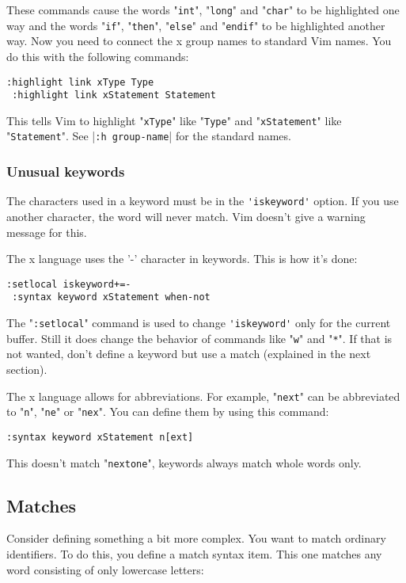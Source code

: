These commands cause the words "\verb!int!", "\verb!long!" and "\verb!char!" to be highlighted one way and the words "\verb!if!", "\verb!then!", "\verb!else!" and "\verb!endif!" to be highlighted another way.
Now you need to connect the x group names to standard Vim names.
You do this with the following commands:

\begin{Verbatim}[samepage=true]
 :highlight link xType Type
 :highlight link xStatement Statement
\end{Verbatim}

This tells Vim to highlight "\verb!xType!" like "\verb!Type!" and "\verb!xStatement!" like "\verb!Statement!".
See |\verb!:h group-name!| for the standard names.

\subsubsection{Unusual keywords}
The characters used in a keyword must be in the \verb!'iskeyword'! option.
If you use another character, the word will never match.
Vim doesn't give a warning message for this.

The x language uses the '-' character in keywords.
This is how it's done:

\begin{Verbatim}[samepage=true]
 :setlocal iskeyword+=-
 :syntax keyword xStatement when-not
\end{Verbatim}

The "\verb!:setlocal!" command is used to change \verb!'iskeyword'! only for the current buffer.
Still it does change the behavior of commands like "\verb!w!" and "\verb!*!".
If that is not wanted, don't define a keyword but use a match (explained in the next section).

The x language allows for abbreviations.
For example, "\verb!next!" can be abbreviated to "\verb!n!", "\verb!ne!" or "\verb!nex!".
You can define them by using this command:

\begin{Verbatim}[samepage=true]
 :syntax keyword xStatement n[ext]
\end{Verbatim}

This doesn't match "\verb!nextone!", keywords always match whole words only.
\subsection{Matches}
Consider defining something a bit more complex.
You want to match ordinary identifiers.
To do this, you define a match syntax item.
This one matches any word consisting of only lowercase letters:

